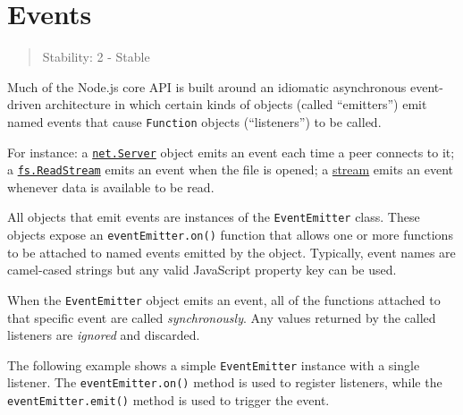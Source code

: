 \section{Events}\label{events}

\begin{quote}
Stability: 2 - Stable
\end{quote}

Much of the Node.js core API is built around an idiomatic asynchronous
event-driven architecture in which certain kinds of objects (called
``emitters'') emit named events that cause \texttt{Function} objects
(``listeners'') to be called.

For instance: a \href{net.md\#class-netserver}{\texttt{net.Server}}
object emits an event each time a peer connects to it; a
\href{fs.md\#class-fsreadstream}{\texttt{fs.ReadStream}} emits an event
when the file is opened; a \href{stream.md}{stream} emits an event
whenever data is available to be read.

All objects that emit events are instances of the \texttt{EventEmitter}
class. These objects expose an \texttt{eventEmitter.on()} function that
allows one or more functions to be attached to named events emitted by
the object. Typically, event names are camel-cased strings but any valid
JavaScript property key can be used.

When the \texttt{EventEmitter} object emits an event, all of the
functions attached to that specific event are called
\emph{synchronously}. Any values returned by the called listeners are
\emph{ignored} and discarded.

The following example shows a simple \texttt{EventEmitter} instance with
a single listener. The \texttt{eventEmitter.on()} method is used to
register listeners, while the \texttt{eventEmitter.emit()} method is
used to trigger the event.

\begin{Shaded}
\begin{Highlighting}[]
\NormalTok{ \{ }\NormalTok{ \} } \OperatorTok{;}

 \NormalTok{ \{\}}

\OperatorTok{=}  \NormalTok{()}\OperatorTok{;}
\NormalTok{(}\OperatorTok{,}\NormalTok{ () }\KeywordTok{=\textgreater{}}\NormalTok{ \{}
  \NormalTok{(}\NormalTok{)}\OperatorTok{;}
\NormalTok{\})}\OperatorTok{;}
\NormalTok{(}\NormalTok{)}\OperatorTok{;}
\end{Highlighting}
\end{Shaded}

